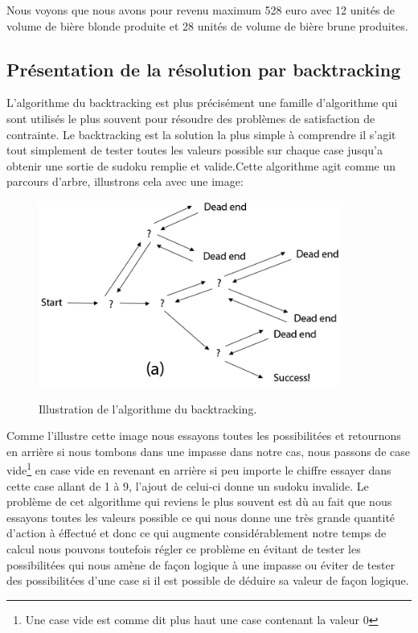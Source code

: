 Nous voyons que nous avons pour revenu maximum 528 euro avec 12 unités de volume de bière blonde produite et 28 unités de volume de bière brune produites.

\subsection{Présentation de la résolution par backtracking}
L'algorithme du backtracking est plus précisément une famille d'algorithme qui sont utilisés le plus souvent pour résoudre des problèmes de satisfaction de contrainte.
Le backtracking est la solution la plus simple à comprendre il s'agit tout simplement de tester toutes les valeurs possible sur chaque case jusqu'a obtenir une sortie de sudoku remplie et valide.Cette algorithme agit comme un parcours d'arbre, illustrons cela avec une image:\newline

\begin{figure}[h]
  \begin{center}
\includegraphics[width=10cm]{./images/backtracking.png}\label{Backtracking}
\caption{Illustration de l'algorithme du backtracking.}
\end{center}
\end{figure}

Comme l'illustre cette image nous essayons toutes les possibilitées et retournons en arrière si nous tombons dans une impasse dans notre cas, nous passons de case vide\footnote{\label{vide}Une case vide est comme dit plus haut une case contenant la valeur 0} en case vide en revenant en arrière si peu importe le chiffre essayer dans cette case allant de 1 à 9, l'ajout de celui-ci donne un sudoku invalide. Le problème de cet algorithme qui reviens le plus souvent est dù au fait que nous essayons toutes les valeurs possible ce qui nous donne une très grande quantité d'action à éffectué et donc ce qui augmente considérablement notre temps de calcul nous pouvons toutefois régler ce problème en évitant de tester les possibilitées qui nous amène de façon logique à une impasse ou éviter de tester des possibilitées d'une case si il est possible de déduire sa valeur de façon logique.

